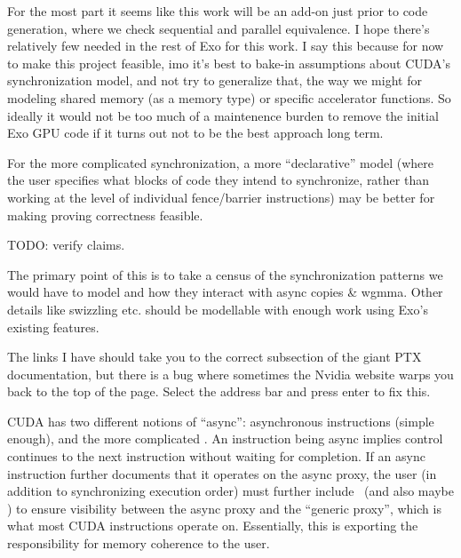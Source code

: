 \filbreak
{}

For the most part it seems like this work will be an add-on just prior to code generation, where we check sequential and parallel equivalence. I hope there's relatively few  needed in the rest of Exo for this work. I say this because for now to make this project feasible, imo it's best to bake-in assumptions about CUDA's synchronization model, and not try to generalize that, the way we might for modeling shared memory (as a memory type) or specific accelerator functions. So ideally it would not be too much of a maintenence burden to remove the initial Exo GPU code if it turns out not to be the best approach long term.

\filbreak
For the more complicated synchronization, a more ``declarative'' model (where the user specifies what blocks of code they intend to synchronize, rather than working at the level of individual fence/barrier instructions) may be better for making proving correctness feasible.

\filbreak
{}

TODO: verify  claims.

The primary point of this is to take a census of the synchronization patterns we would have to model and how they interact with async copies \& wgmma. Other details like swizzling etc. should be modellable with enough work using Exo's existing features.

 The links I have should take you to the correct subsection of the giant PTX documentation, but there is a bug where sometimes the Nvidia website warps you back to the top of the page. Select the address bar and press enter to fix this.

\filbreak
{}

CUDA has two different notions of ``async'': asynchronous instructions (simple enough), and the more complicated . An instruction being async implies control continues to the next instruction without waiting for completion. If an async instruction further documents that it operates on the async proxy, the user (in addition to synchronizing execution order) must further include \fenceProxyAsync\ (and also maybe ) to ensure visibility between the async proxy and the ``generic proxy'', which is what most CUDA instructions operate on. Essentially, this is exporting the responsibility for memory coherence to the user.


